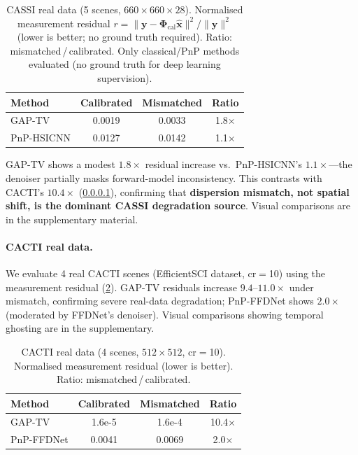 \documentclass[runningheads]{llncs}
\begin{document}
\begin{table}[t]
\centering
\caption{CASSI real data (5 scenes, $660 \times 660 \times 28$). Normalised measurement residual $r = \|\mathbf{y} - \mathbf{\Phi}_{\text{cal}}\hat{\mathbf{x}}\|^2 / \|\mathbf{y}\|^2$ (lower is better; no ground truth required). Ratio: mismatched\,/\,calibrated. Only classical/PnP methods evaluated (no ground truth for deep learning supervision).}
\label{tab:cassi_real}
\begin{tabular}{@{}lccc@{}}
\toprule
\textbf{Method} & \textbf{Calibrated} & \textbf{Mismatched} & \textbf{Ratio} \\
\midrule
GAP-TV            & 0.0019 & 0.0033 & 1.8$\times$ \\
PnP-HSICNN        & 0.0127 & 0.0142 & 1.1$\times$ \\
\bottomrule
\end{tabular}
\end{table}

GAP-TV shows a modest $1.8\times$ residual increase vs.\ PnP-HSICNN's $1.1\times$---the denoiser partially masks forward-model inconsistency.
This contrasts with CACTI's $10.4\times$ (\cref{sec:cacti_real_data}), confirming that \textbf{dispersion mismatch, not spatial shift, is the dominant CASSI degradation source}.
Visual comparisons are in the supplementary material.



\paragraph{CACTI real data.}
\label{sec:cacti_real_data}
We evaluate 4 real CACTI scenes (EfficientSCI dataset, cr$=$10) using the measurement residual (\cref{tab:cacti_real}).
GAP-TV residuals increase $9.4$--$11.0\times$ under mismatch, confirming severe real-data degradation; PnP-FFDNet shows $2.0\times$ (moderated by FFDNet's denoiser).
Visual comparisons showing temporal ghosting are in the supplementary.

\begin{table}[t]
\centering
\caption{CACTI real data (4 scenes, $512 \times 512$, cr$=$10). Normalised measurement residual (lower is better). Ratio: mismatched\,/\,calibrated.}
\label{tab:cacti_real}
\begin{tabular}{@{}lccc@{}}
\toprule
\textbf{Method} & \textbf{Calibrated} & \textbf{Mismatched} & \textbf{Ratio} \\
\midrule
GAP-TV     & 1.6e-5 & 1.6e-4 & 10.4$\times$ \\
PnP-FFDNet & 0.0041 & 0.0069 & 2.0$\times$ \\
\bottomrule
\end{tabular}
\end{table}
\end{document}
